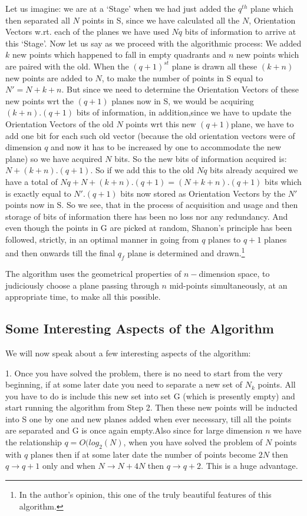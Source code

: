 \documentclass[english]{article}
\begin{document}
Let us imagine: we are at a `Stage' when we had just added the $q^{th}$
plane which then separated all $N$ points in S, since we have calculated
all the $N$, Orientation Vectors w.rt. each of the planes we have
used $Nq$ bits of information to arrive at this `Stage'. Now let
us say as we proceed with the algorithmic process: We added $k$ new
points which happened to fall in empty quadrants and $n$ new points
which are paired with the old. When the $(q+1)^{st}$ plane is drawn
all these $(k+n)$ new points are added to $N$, to make the number
of points in S equal to $N'=N+k+n$. But since we need to determine
the Orientation Vectors of these new points wrt the $(q+1)$ planes
now in S, we would be acquiring $(k+n).(q+1)$ bits of information,
in addition,since we have to update the Orientation Vectors of the
old $N$ points wrt this new $(q+1)$plane, we have to add one bit
for each such old vector (because the old orientation vectors were
of dimension $q$ and now it has to be increased by one to accommodate
the new plane) so we have acquired $N$ bits. So the new bits of information
acquired is: $N+(k+n).(q+1)$. So if we add this to the old $Nq$
bits already acquired we have a total of $Nq+N+(k+n).(q+1)=(N+k+n).(q+1)$
bits which is exactly equal to $N'.(q+1)$ bits now stored as Orientation
Vectors by the $N'$ points now in S. So we see, that in the process
of acquisition and usage and then storage of bits of information there
has been no loss nor any redundancy. And even though the points in
G are picked at random, Shanon's principle has been followed, strictly,
in an optimal manner in going from $q$ planes to $q+1$ planes and
then onwards till the final $q_{f}$ plane is determined and drawn.\footnote{In the author's opinion, this one of the truly beautiful features
of this algorithm.}

The algorithm uses the geometrical properties of $n-$dimension space,
to judiciously choose a plane passing through $n$ mid-points simultaneously,
at an appropriate time, to make all this possible.


\subsection{Some Interesting Aspects of the Algorithm}

We will now speak about a few interesting aspects of the algorithm:

1. Once you have solved the problem, there is no need to start from
the very beginning, if at some later date you need to separate a new
set of $N_{k}$ points. All you have to do is include this new set
into set G (which is presently empty) and start running the algorithm
from Step 2. Then these new points will be inducted into S one by
one and new planes added when ever necessary, till all the points
are separated and G is once again empty.Also since for large dimension
$n$ we have the relationship $q=O(log_{2}(N)$, when you have solved
the problem of $N$ points with $q$ planes then if at some later
date the number of points become $2N$ then $q\rightarrow q+1$ only
and when $N\rightarrow N+4N$ then $q\rightarrow q+2$. This is a
huge advantage.
\end{document}
